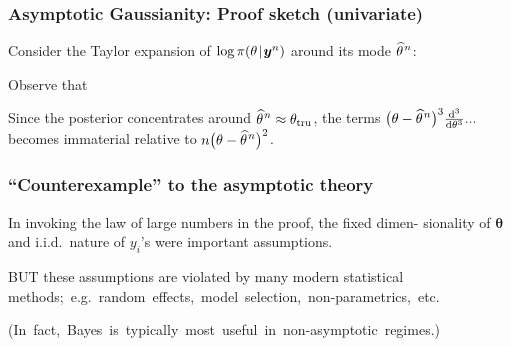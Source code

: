 \documentclass[18pt]{beamer}
\newcommand{\defineTightItemizeSpacing}{%
	\setlength{\abovedisplayskip}{.25\baselineskip}%
	\setlength{\belowdisplayskip}{.25\baselineskip}%
}
\newenvironment{tightEquation*}{%
	\defineTightItemizeSpacing%
	\begin{equation*}
}{
	\end{equation*} \ignorespacesafterend
}
\newcommand{\given}{\thinnerspace | \thinnerspace}
\newcommand{\diff}{\operatorname{\mathrm{d}}\!{}}
\newcommand{\thinnerspace}{\mskip.5\thinmuskip}
\newcommand{\expectation}{\mathbb{E}}
\newcommand{\truthSub}{\mathrm{tru}}
\newcommand{\density}{\pi}
\newcommand{\likelihood}{L}
\newcommand{\by}{\bm{y}}
\newcommand{\btheta}{\bm{\theta}}
\begin{document}
\newcommand{\samplesizeDependentMap}{\widehat{\theta}^{\text{\raisebox{.1ex}{$\thinnerspace n$}}}}
\begin{frame}
\frametitle{Asymptotic Gaussianity: Proof sketch (univariate)}
Consider the Taylor expansion of $\log \density(\theta \given \by^n)$ around its mode $\samplesizeDependentMap$:
\begin{tightEquation*}
\end{tightEquation*}
\pause%
Observe that 
\begin{tightEquation*}
\end{tightEquation*}
\pause%
Since the posterior concentrates around $\samplesizeDependentMap \approx \theta_\truthSub$, the terms $\big( \theta - \samplesizeDependentMap \big)^3 \frac{\diff^3}{\diff \theta^3} ...$ becomes immaterial relative to $n \big( \theta - \samplesizeDependentMap \big)^2$. 
\hfill \qedsymbol
\end{frame}

\begin{frame}
\frametitle{``Counterexample'' to the asymptotic theory}
In invoking the law of large numbers in the proof, the fixed dimen- sionality of $\btheta$ and i.i.d.\ nature of $y_i$'s were important assumptions.

\pause%
B{\small UT} these assumptions are violated by many modern statistical \mbox{methods; e.g.\ random effects, model selection, non-parametrics, etc.}

\pause%
\mbox{(In fact, Bayes is typically most useful in non-asymptotic regimes.)}
\end{frame}
\end{document}
